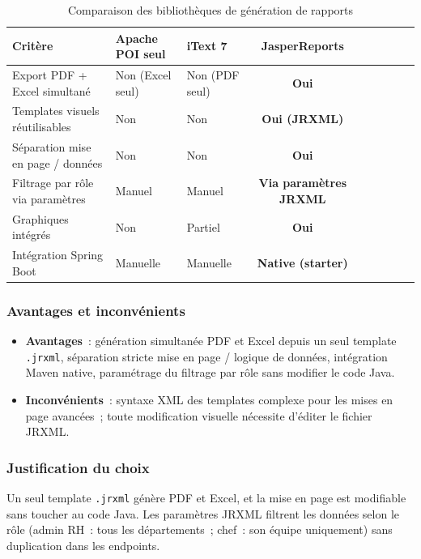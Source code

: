 \begin{table}[H]
\centering
\caption{Comparaison des bibliothèques de génération de rapports}
\label{tab:cmp_reporting}
\begin{tabularx}{\textwidth}{VlVCVCVCV}
\hline
\textbf{Critère} & \textbf{Apache POI seul} & \textbf{iText 7} & \textbf{JasperReports} \\
\hline
Export PDF + Excel simultané & Non (Excel seul) & Non (PDF seul) & \textbf{Oui} \\
\hline
Templates visuels réutilisables & Non & Non & \textbf{Oui (JRXML)} \\
\hline
Séparation mise en page / données & Non & Non & \textbf{Oui} \\
\hline
Filtrage par rôle via paramètres & Manuel & Manuel & \textbf{Via paramètres JRXML} \\
\hline
Graphiques intégrés           & Non      & Partiel  & \textbf{Oui} \\
\hline
Intégration Spring Boot      & Manuelle & Manuelle & \textbf{Native (starter)} \\
\hline
\end{tabularx}
\end{table}

\subsubsection*{Avantages et inconvénients}

\begin{itemize}[leftmargin=*,nosep]
  \item \textbf{Avantages}~: génération simultanée PDF et Excel depuis un seul template
        \texttt{.jrxml}, séparation stricte mise en page / logique de données, intégration
        Maven native, paramétrage du filtrage par rôle sans modifier le code Java.
  \item \textbf{Inconvénients}~: syntaxe XML des templates complexe pour les mises en
        page avancées~; toute modification visuelle nécessite d'éditer le fichier JRXML.
\end{itemize}

\subsubsection*{Justification du choix}

Un seul template \texttt{.jrxml} génère PDF et Excel, et la mise en page est modifiable sans toucher au code Java. Les paramètres JRXML filtrent les données selon le rôle (admin RH~: tous les départements~; chef~: son équipe uniquement) sans duplication dans les endpoints.

